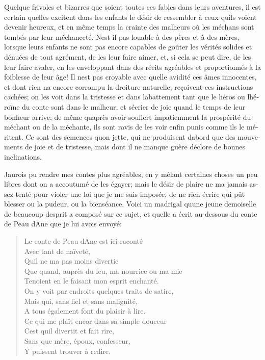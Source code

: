 \documentclass[14pt,a4paper]{memoir}
\begin{document}
{{\begin{otherlanguage}{french}
Quelque frivoles et bizarres que soient toutes ces fables dans leurs
aventures, il est certain qu\textquotesingle elles excitent dans les
enfants le désir de ressembler à ceux qu\textquotesingle ils voient
devenir heureux, et en même temps la crainte des malheurs où les méchans
sont tombés par leur méchanceté. N\textquotesingle est-il pas louable à
des pères et à des mères, lorsque leurs enfants ne sont pas encore
capables de goûter les vérités solides et dénuées de tout agrément, de
les leur faire aimer, et, si cela se peut dire, de les leur faire
avaler, en les enveloppant dans des récits agréables et proportionnés à
la foiblesse de leur âge! Il n\textquotesingle est pas croyable avec
quelle avidité ces âmes innocentes, et dont rien n\textquotesingle a
encore corrompu la droiture naturelle, reçoivent ces instructions
cachées; on les voit dans la tristesse et dans
l\textquotesingle abattement tant que le héros ou
l\textquotesingle héroïne du conte sont dans le malheur, et
s\textquotesingle écrier de joie quand le temps de leur bonheur arrive;
de même qu\textquotesingle après avoir souffert impatiemment la
prospérité du méchant ou de la méchante, ils sont ravis de les voir
enfin punis comme ils le méritent. Ce sont des semences
qu\textquotesingle on jette, qui ne produisent d\textquotesingle abord
que des mouvements de joie et de tristesse, mais dont il ne manque guère
d\textquotesingle éclore de bonnes inclinations.

J\textquotesingle aurois pu rendre mes contes plus agréables, en y
mêlant certaines choses un peu libres dont on a accoutumé de les égayer;
mais le désir de plaire ne m\textquotesingle a jamais assez tenté pour
violer une loi que je me suis imposée, de ne rien écrire qui pût blesser
ou la pudeur, ou la bienséance. Voici un madrigal qu\textquotesingle une
jeune demoiselle de beaucoup d\textquotesingle esprit a composé sur ce
sujet, et qu\textquotesingle elle a écrit au-dessous du conte de Peau
d\textquotesingle Ane que je lui avois envoyé:

\begin{verse}
  \small
Le conte de Peau d\textquotesingle Ane est ici raconté \\
Avec tant de naïveté, \\
Qu\textquotesingle il ne m\textquotesingle a pas moins divertie \\
Que quand, auprès du feu, ma nourrice ou ma mie  \\
Tenoient en le faisant mon esprit enchanté. \\
On y voit par endroits quelques traits de satire,  \\
Mais qui, sans fiel et sans malignité, \\
A tous également font du plaisir à lire. \\
Ce qui me plaît encor dans sa simple douceur \\
C\textquotesingle est qu\textquotesingle il divertit et fait rire, \\
Sans que mère, époux, confesseur, \\
Y puissent trouver à redire. 
\end{verse}


\end{otherlanguage}}}
\end{document}
